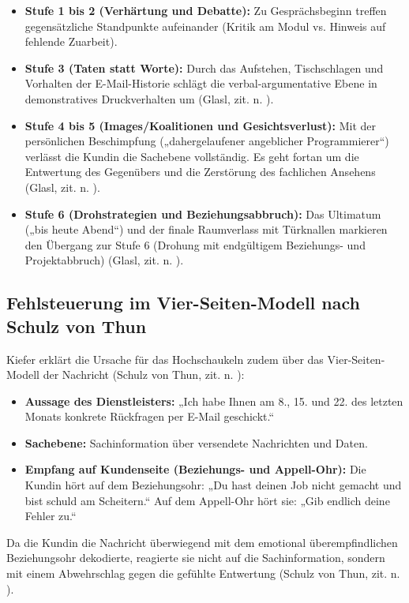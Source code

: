 \begin{itemize}
    \item \textbf{Stufe 1 bis 2 (Verhärtung und Debatte):} Zu Gesprächsbeginn treffen gegensätzliche Standpunkte aufeinander (Kritik am Modul vs. Hinweis auf fehlende Zuarbeit).
    \item \textbf{Stufe 3 (Taten statt Worte):} Durch das Aufstehen, Tischschlagen und Vorhalten der E-Mail-Historie schlägt die verbal-argumentative Ebene in demonstratives Druckverhalten um (Glasl, zit. n. \cite[S.~36--37]{5}).
    \item \textbf{Stufe 4 bis 5 (Images/Koalitionen und Gesichtsverlust):} Mit der persönlichen Beschimpfung („dahergelaufener angeblicher Programmierer“) verlässt die Kundin die Sachebene vollständig. Es geht fortan um die Entwertung des Gegenübers und die Zerstörung des fachlichen Ansehens (Glasl, zit. n. \cite[S.~37--38]{5}).
    \item \textbf{Stufe 6 (Drohstrategien und Beziehungsabbruch):} Das Ultimatum („bis heute Abend“) und der finale Raumverlass mit Türknallen markieren den Übergang zur Stufe 6 (Drohung mit endgültigem Beziehungs- und Projektabbruch) (Glasl, zit. n. \cite[S.~39--40]{5}).
\end{itemize}

\subsection{Fehlsteuerung im Vier-Seiten-Modell nach Schulz von Thun}
Kiefer erklärt die Ursache für das Hochschaukeln zudem über das Vier-Seiten-Modell der Nachricht (Schulz von Thun, zit. n. \cite[S.~19--24]{3}):
\begin{itemize}
    \item \textbf{Aussage des Dienstleisters:} „Ich habe Ihnen am 8., 15. und 22. des letzten Monats konkrete Rückfragen per E-Mail geschickt.“
    \item \textbf{Sachebene:} Sachinformation über versendete Nachrichten und Daten.
    \item \textbf{Empfang auf Kundenseite (Beziehungs- und Appell-Ohr):} Die Kundin hört auf dem Beziehungsohr: „Du hast deinen Job nicht gemacht und bist schuld am Scheitern.“ Auf dem Appell-Ohr hört sie: „Gib endlich deine Fehler zu.“
\end{itemize}
Da die Kundin die Nachricht überwiegend mit dem emotional überempfindlichen Beziehungsohr dekodierte, reagierte sie nicht auf die Sachinformation, sondern mit einem Abwehrschlag gegen die gefühlte Entwertung (Schulz von Thun, zit. n. \cite[S.~21--22]{3}).

